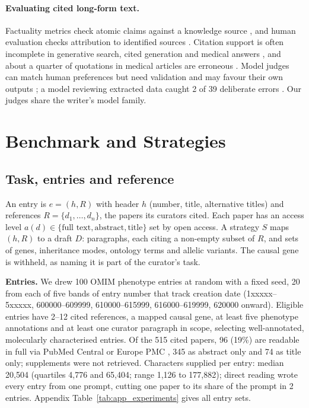 \documentclass{article} %
\begin{document}
\paragraph{Evaluating cited long-form text.}
Factuality metrics check atomic claims against a knowledge source \citep{min2023factscore,wei2024longform,Song2024VeriscoreEvaluating}, and human evaluation checks attribution to identified sources \citep{Rashkin2021MeasuringAttribution}. Citation support is often incomplete in generative search, cited generation and medical answers \citep{Liu2023EvaluatingVerifiability,gao2023enabling,wu2025automated}, and about a quarter of quotations in medical articles are erroneous \citep{jergas2015quotation}. Model judges can match human preferences \citep{zheng2023judging} but need validation \citep{shankar2024who} and may favour their own outputs \citep{panickssery2024llm}; a model reviewing extracted data caught 2 of 39 deliberate errors \citep{Stewartevans2025ExpeditingData}. Our judges share the writer's model family.

\section{Benchmark and Strategies}
\label{sec:method}
\subsection{Task, entries and reference}
\label{sec:task}
An entry is $e=(h,R)$ with header $h$ (number, title, alternative titles) and references $R=\{d_1,\dots,d_n\}$, the papers its curators cited. Each paper has an access level $a(d)\in\{\text{full text},\text{abstract},\text{title}\}$ set by open access. A strategy $S$ maps $(h,R)$ to a draft $D$: paragraphs, each citing a non-empty subset of $R$, and sets of genes, inheritance modes, ontology terms and allelic variants. The causal gene is withheld, as naming it is part of the curator's task.

\textbf{Entries.} We drew 100 OMIM phenotype entries at random with a fixed seed, 20 from each of five bands of entry number that track creation date (1xxxxx--5xxxxx, 600000--609999, 610000--615999, 616000--619999, 620000 onward). Eligible entries have 2--12 cited references, a mapped causal gene, at least five phenotype annotations and at least one curator paragraph in scope, selecting well-annotated, molecularly characterised entries. Of the 515 cited papers, 96 (19\%) are readable in full via PubMed Central or Europe PMC \citep{rosonovski2024europe}, 345 as abstract only and 74 as title only; supplements were not retrieved. Characters supplied per entry: median 20,504 (quartiles 4,776 and 65,404; range 1,126 to 177,882); direct reading wrote every entry from one prompt, cutting one paper to its share of the prompt in 2 entries. Appendix Table~\ref{tab:app_experiments} gives all entry sets.
\end{document}
